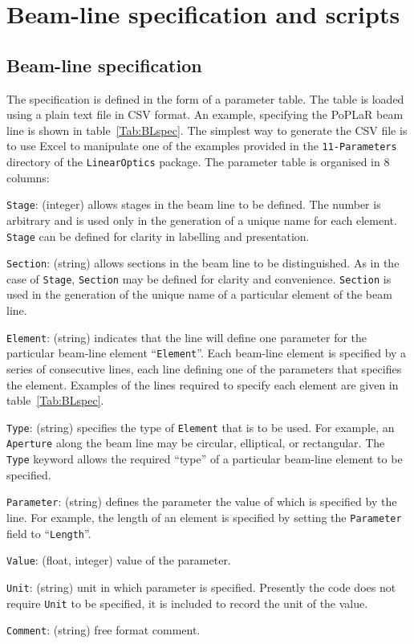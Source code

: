 \graphicspath{ {06-BLspecScrpts/Figures/} }

\section{Beam-line specification and scripts}

\subsection{Beam-line specification}

The specification is defined in the form of a parameter table.
The table is loaded using a plain text file in CSV format.
An example, specifying the PoPLaR beam line is shown in
table~\ref{Tab:BLspec}.
The simplest way to generate the CSV file is to use Excel to
manipulate one of the examples provided in the \texttt{11-Parameters}
directory of the \texttt{LinearOptics} package.
The parameter table is organised in 8 columns:
\begin{description}
  \item{\texttt{Stage}:} (integer) allows stages in the beam line to
    be defined.
    The number is arbitrary and is used only in the generation of a
    unique name for each element.
    \texttt{Stage} can be defined for clarity in labelling and
    presentation.
  \item{\texttt{Section}:} (string) allows sections in the beam line
    to be distinguished.
    As in the case of \texttt{Stage}, \texttt{Section} may be defined
    for clarity and convenience.
    \texttt{Section} is used in the generation of the unique name of a
    particular element of the beam line.
  \item{\texttt{Element}:} (string) indicates that the line will
    define one parameter for the particular beam-line element
    ``\texttt{Element}''.
    Each beam-line element is specified by a series of consecutive
    lines, each line defining one of the parameters that specifies the
    element. 
    Examples of the lines required to specify each element are given in
    table~\ref{Tab:BLspec}.
  \item{\texttt{Type}:} (string) specifies the type
    of \texttt{Element} that is to be used.
    For example, an \texttt{Aperture} along the beam line may be
    circular, elliptical, or rectangular.
    The \texttt{Type} keyword allows the required ``type'' of a
    particular beam-line element to be specified.
  \item{\texttt{Parameter}:} (string) defines the parameter the value
    of which is specified by the line.
    For example, the length of an element is specified by setting
    the \texttt{Parameter} field to ``\texttt{Length}''.
  \item{\texttt{Value}:} (float, integer) value of the parameter.
  \item{\texttt{Unit}:} (string) unit in which parameter is specified.
    Presently the code does not require \texttt{Unit} to be
    specified, it is included to record the unit of the value.
  \item{\texttt{Comment}:} (string) free format comment.
\end{description}
